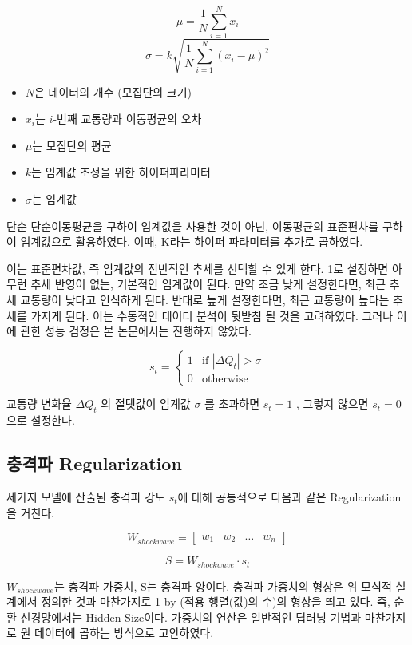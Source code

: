 \documentclass[11pt]{report}
\begin{document}
$$
\mu = \frac{1}{N} \sum_{i=1}^{N} x_i
$$
$$
\sigma = k \sqrt{\frac{1}{N} \sum_{i=1}^{N} (x_i - \mu)^2}
$$

\begin{itemize}
    \item $N$은 데이터의 개수 (모집단의 크기)
    \item $x_i$는 $i$-번째 교통량과 이동평균의 오차
    \item $\mu$는 모집단의 평균
    \item $k$는 임계값 조정을 위한 하이퍼파라미터
    \item $\sigma$는 임계값
\end{itemize}

단순 단순이동평균을 구하여 임계값을 사용한 것이 아닌, 이동평균의 표준편차를 구하여 임계값으로 활용하였다. 
이때, K라는 하이퍼 파라미터를 추가로 곱하였다. 

이는 표준편차값, 즉 임계값의 전반적인 추세를 선택할 수 있게 한다. 1로 설정하면 아무런 추세 반영이 없는, 기본적인 임계값이 된다. 
만약 조금 낮게 설정한다면, 최근 추세 교통량이 낮다고 인식하게 된다. 반대로 높게 설정한다면, 최근 교통량이 높다는 추세를 가지게 된다. 
이는 수동적인 데이터 분석이 뒷받침 될 것을 고려하였다. 
그러나 이에 관한 성능 검정은 본 논문에서는 진행하지 않았다. 

$$
s_t = \begin{cases}
	1 & \text{if } |\Delta Q_t| > \sigma \\
	0 & \text{otherwise}
	\end{cases}
$$

교통량 변화율  $\Delta Q_t$ 의 절댓값이 임계값  $\sigma$ 를 초과하면  $s_t = 1$ , 그렇지 않으면  $s_t = 0$ 으로 설정한다.

\subsection{충격파 Regularization}
세가지 모델에 산출된 충격파 강도 $s_t$에 대해 공통적으로 다음과 같은 Regularization을 거친다.

$$
W_{shockwave} = \begin{bmatrix}
	w_1 & w_2 & \dots
	 & w_n 
	\end{bmatrix}
$$

$$
S = W_{shockwave} \cdot s_t 
$$

$W_{shockwave}$는 충격파 가중치, S는 충격파 양이다. 
충격파 가중치의 형상은 위 모식적 설계에서 정의한 것과 마찬가지로 1 by (적용 행렬(값)의 수)의 형상을 띄고 있다. 즉, 순환 신경망에서는 Hidden Size이다. 
가중치의 연산은 일반적인 딥러닝 기법과 마찬가지로 원 데이터에 곱하는 방식으로 고안하였다. 
\end{document}
